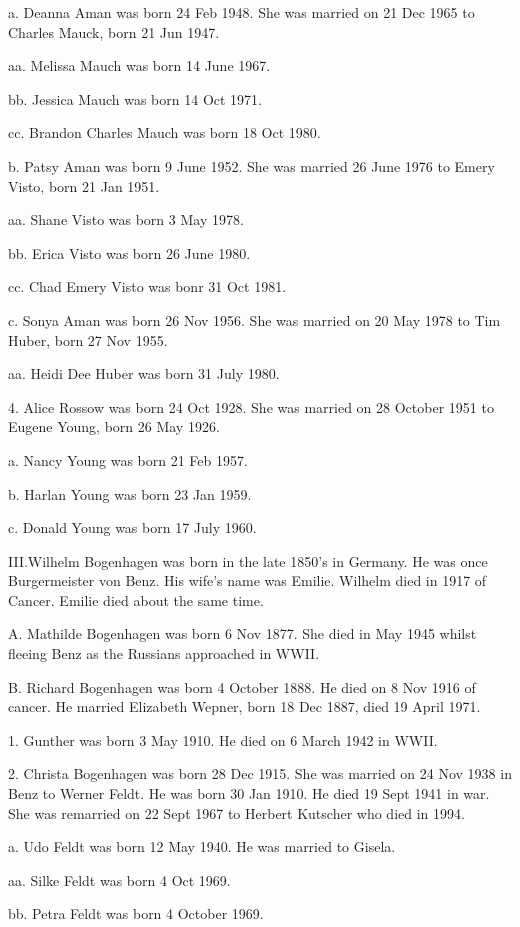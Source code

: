 \documentclass[a4paper]{article}
\begin{document}
a. Deanna Aman was born 24 Feb 1948.  She was married on 21 Dec 1965 to Charles Mauck, born 21 Jun 1947.  
 
aa. Melissa Mauch was born 14 June 1967.

bb. Jessica Mauch was born 14 Oct 1971.

cc. Brandon Charles Mauch was born 18 Oct 1980.

b. Patsy Aman was born 9 June 1952.  She was married 26 June 1976 to Emery Visto, born 21 Jan 1951.
 
aa. Shane Visto was born 3 May 1978.

bb. Erica Visto was born 26 June 1980.

cc. Chad Emery Visto was bonr 31 Oct 1981.

c. Sonya Aman was born 26 Nov 1956.  She was married on 20 May 1978 to Tim Huber, born 27 Nov 1955.
 
aa. Heidi Dee Huber was born 31 July 1980.

4. Alice Rossow was born 24 Oct 1928.  She was married on 28 October 1951 to Eugene Young, born 26 May 1926.
		 
a. Nancy Young was born 21 Feb 1957.

b. Harlan Young was born 23 Jan 1959.

c. Donald Young was born 17 July 1960.

III.Wilhelm Bogenhagen was born in the late 1850's in Germany.  He was once Burgermeister von Benz.  His wife's name was Emilie.  Wilhelm died in 1917 of Cancer.  Emilie died about the same time.

A. Mathilde Bogenhagen was born 6 Nov 1877.  She died in May 1945 whilst fleeing Benz as the Russians approached in WWII.
 
B. Richard Bogenhagen was born 4 October 1888.  He died on 8 Nov 1916 of cancer.  He married Elizabeth Wepner, born 18 Dec 1887, died 19 April 1971.  
 
1. Gunther was born 3 May 1910.  He died on 6 March 1942 in WWII.

2. Christa Bogenhagen was born 28 Dec 1915.  She was married on 24 Nov 1938 in Benz to Werner Feldt.  He was born 30 Jan 1910. He died 19 Sept 1941 in war. She was remarried on 22 Sept 1967 to Herbert Kutscher who died in 1994. 

a. Udo Feldt was born 12 May 1940.  He was married to Gisela.

aa. Silke Feldt was born 4 Oct 1969.

bb. Petra Feldt was born 4 October 1969.
	
\end{document}
